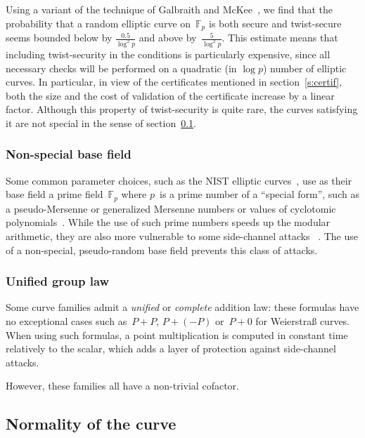 \documentclass[twocolumn,letterpaper,10pt]{article}
\def\F{\mathbb{F}}
\begin{document}
Using a variant of the technique of Galbraith and McKee~\cite{lms2000gm},
we find that the probability that a random elliptic curve on~$\F_p$
is both secure and twist-secure
seems bounded below by $\frac{0.5}{\log^2 p}$
and above by~$\frac{5}{\log^2 p}$.
This estimate means that
including twist-security in the conditions is particularly expensive,
since all necessary checks will be performed on
a quadratic (in $\log p$) number of elliptic curves.
In particular, in view of
the certificates mentioned in section~\ref{s:certif},
both the size and the cost of validation of the certificate
increase by a linear factor.
Although this property of twist-security is quite rare,
the curves satisfying it are not special
in the sense of section~\ref{ss:normal}.

\subsubsection{Non-special base field}
\label{sss:special-side}

Some common parameter choices,
such as the NIST elliptic curves~\cite{nist2000fips186-2},
use as their base field a prime field~$\F_p$
where $p$~is a prime number of a ``special form'',
such as a pseudo-Mersenne or generalized Mersenne numbers
or values of cyclotomic polynomials~\cite{mc2013gm}.
While the use of such prime numbers speeds up the modular arithmetic,
they are also more vulnerable to some side-channel attacks%
~\cite{ches2005dkj,ics2005ss,ches2014bpsy,eprint2014-434,ieice2006ss}.
The use of a non-special, pseudo-random base field
prevents this class of attacks.

\subsubsection{Unified group law}
\label{sss:unified}

Some curve families admit a \emph{unified} or \emph{complete}
addition law: these formulas have no exceptional cases
such as~$P + P$, $P + (-P)$ or~$P + 0$ for Weierstraß curves.
When using such formulas, a point multiplication
is computed in constant time relatively to the scalar,
which adds a layer of protection against side-channel attacks.

However, these families all have a non-trivial cofactor.

\subsection{Normality of the curve}
\label{ss:normal}
\end{document}

